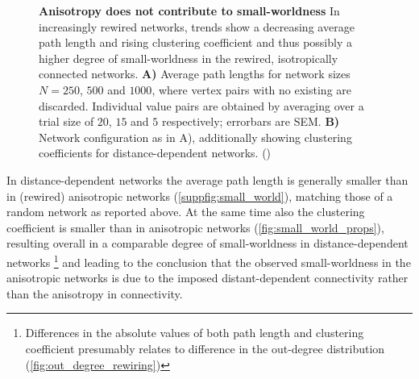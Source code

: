 \begin{figure}[!htb]
  \centering
  \captionsetup{skip=8pt}
  \caption{\textbf{Anisotropy does not contribute to small-worldness}
    In increasingly rewired networks, trends show a decreasing average
    path length and rising clustering coefficient and thus possibly a
    higher degree of small-worldness in the rewired, isotropically
    connected networks.  \textbf{A)} Average path lengths for network
    sizes $N=250$, $500$ and $1000$, where vertex pairs with no
    existing are discarded. Individual value pairs are obtained by
    averaging over a trial size of $20$, $15$ and $5$ respectively;
    errorbars are SEM. \textbf{B)} Network configuration as in A),
    additionally showing clustering coefficients for
    distance-dependent networks.
    ()} %
  \label{fig:small_world_props}
\end{figure}  

In distance-dependent networks the average path length is generally
smaller than in (rewired) anisotropic networks
(\autoref{suppfig:small_world}), matching those of a random network as
reported above. At the same time also the clustering coefficient is
smaller than in anisotropic networks
(\autoref{fig:small_world_props}), resulting overall in a comparable
degree of small-worldness in distance-dependent networks
\footnote{Differences in the absolute values of both path length and
  clustering coefficient presumably relates to difference in the
  out-degree distribution (\autoref{fig:out_degree_rewiring})} and
leading to the conclusion that the observed small-worldness in the
anisotropic networks is due to the imposed distant-dependent
connectivity rather than the anisotropy in connectivity.







